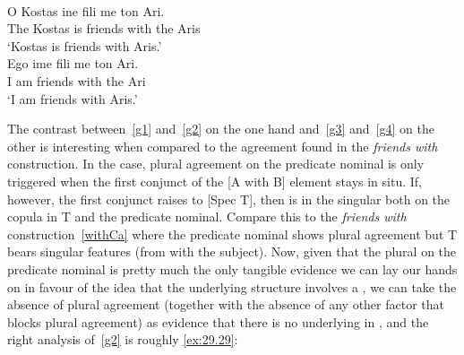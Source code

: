 \documentclass[output=paper]{langsci/langscibook}
\begin{document}
\ea\label{ex:29.27} \\
    \gll    \llap{*}O Kostas ine fili me ton Ari.\\
            The Kostas is friends with the Aris\\ \label{g3}
    \glt    \enquote*{Kostas is friends with Aris.}
\ex\label{ex:29.28} \\
    \gll    \llap{*}Ego ime fili me ton Ari.\\
            I am friends with the Ari\\ \label{g4}
    \glt    \enquote*{I am friends with Aris.}
\z

The  contrast between~\eqref{g1} and~\eqref{g2} on the one hand
and~\eqref{g3} and~\eqref{g4} on the other is interesting when compared to the
agreement found in the  \emph{friends with} construction. In the
 case, plural agreement on the
predicate nominal is only triggered when the first conjunct of the [A with B]
element stays in situ. If, however, the first conjunct raises to [Spec T], then
 is in the singular both on the copula in T and the predicate
nominal. Compare this to the  \emph{friends with}
construction~\eqref{withCa} where the predicate nominal shows plural
agreement but T bears singular features (from
 with the subject).  Now, given that the plural on the predicate
nominal is pretty much the only tangible evidence we can lay our hands on in
favour of the idea that the underlying structure involves a ,
we can take the absence of plural agreement
(together with the absence of any other factor that blocks plural
agreement) as evidence that there is no
underlying  in , and the right analysis
of~\eqref{g2} is roughly \eqref{ex:29.29}:

\ea\label{ex:29.29}
\z
\end{document}
